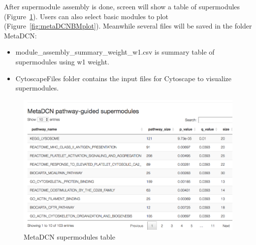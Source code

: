 After supermodule assembly is done, screen will show a table of supermodules (Figure~\ref{fig:metaDCNsuper}). Users can also select basic modules to plot (Figure~\ref{fig:metaDCNBMplot}). Meanwhile several files will be saved in the folder MetaDCN:
\begin{itemize}
\item module\_assembly\_summary\_weight\_w1.csv is summary table of supermodules using w1 weight.
\item CytoscapeFiles folder contains the input files for Cytoscape to visualize supermodules.
\end{itemize}

\begin{figure}[H]
\begin{center}
\includegraphics[scale=0.45]{./figure/metaDCN/metaDCNsuper.png}
\caption{MetaDCN supermodules table}
\label{fig:metaDCNsuper}
\end{center}
\end{figure}

